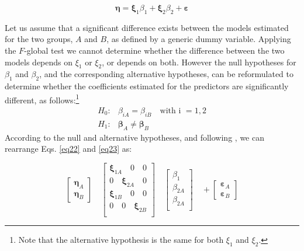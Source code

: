 \begin{equation}
\label{eq4}
\boldsymbol{\eta} = \boldsymbol{\xi}_1\beta_1 + \boldsymbol{\xi}_2\beta_2 + \boldsymbol{\varepsilon}
\end{equation}

Let us assume that a significant difference exists between the models estimated for the two groups,  $A$ and $B$,  as defined by a generic dummy variable. Applying the $F$-global test \citep{Lamberti16} we cannot determine whether the difference between the two models depends on  $\xi_1$ or $\xi_2$, or depends on both. However the null hypotheses for $\beta_1$ and $\beta_2$, and the corresponding alternative hypotheses, can be reformulated to determine whether the coefficients estimated for the predictors are significantly different, as follows:\footnote{Note that the alternative hypothesis is the same for both  $\xi_1$ and $\xi_2$.} 
\begin{align}
\label{eq5}
H_0: &\beta_{iA} =\beta_{iB}  \quad  \text{with i }= 1, 2\\
H_1: &\boldsymbol{\beta}_A \ne \boldsymbol{\beta}_B
\end{align}
According to the null and alternative hypotheses, and following \citet{Lebart79},  we can rearrange Eqs. \ref{eq22} and \ref{eq23}  as:  

\begin{equation}
\label{nul2}
\left[\begin{array}{l}
\boldsymbol{\eta}_A \\
\boldsymbol{\eta}_B 
\end{array}\right] \quad
\left[\begin{array}{ccc}
\boldsymbol{\xi}_{1A}\quad 0 \quad0\\
0 \quad\boldsymbol{\xi}_{2A} \quad0\\
\boldsymbol{\xi}_{1B} \quad0 \quad0\\
0 \quad0 \quad\boldsymbol{\xi}_{2B}\\
\end{array}\right] \quad
\left[\begin{array}{l}
\beta_1 \\
\beta_{2A} \\
\beta_{2A} \\
\end{array}\right]  \quad +
\left[\begin{array}{l}
\boldsymbol{\varepsilon}_A \\
\boldsymbol{\varepsilon}_B 
\end{array}\right] 
\end{equation}

